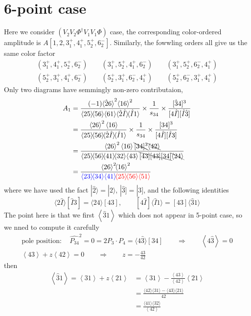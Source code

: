 \documentclass[12pt]{article}
\newcommand{\mdavg}[2]{\langle #1 \rangle\!\langle #2 \rangle}
\newcommand{\avg}[1]{\left\langle #1 \right\rangle}
\newcommand{\inavg}[2]{\langle #1 \rangle\! [#2]}
\newcommand{\rinavg}[2]{[#1]\!\langle #2 \rangle}
\newcommand{\aket}[1]{|#1\rangle}
\newcommand{\asqu}[1]{{\langle#1\rangle}^2}
\newcommand{\sket}[1]{|#1]}
\begin{document}
\section{6-point case}
Here we consider $(V_2V_2\Phi^\dagger V_1V_1 \Phi)$ case, the corresponding color-ordered amplitude is $A[1,2,3_1^+,4_1^+,5_2^+,6_2^-]$.
Similarly, the fowwling orders all give us the same color factor
\begin{gather*}
    (3_1^+,4_1^+,5_2^+,6_2^-)\qquad(3_1^+,5_2^+,4_1^+,6_2^-)\qquad (3_1^+,5_2^+,6_2^-,4_1^+)\\
    (5_2^+,3_1^+,4_1^+,6_2^-)\qquad(5_2^+,3_1^+,6_2^-,4_1^+)\qquad (5_2^+,6_2^-,3_1^+,4_1^+)
\end{gather*}
Only two diagrams have semmingly non-zero contributaion,
\begin{align*}
    A_1&=\frac{(-1)\asqu{\hat{2}6}\asqu{16}}{\mdavg{25}{56}\!\avg{61}\!\mdavg{\hat{2}\hat{I}}{\hat{I}1}}\times\frac{1}{s_{34}}\times\frac{[\hat{3}4]^3}{[4\hat{I}][\hat{I}\hat{3}]}\\
    &=\frac{\asqu{26}\avg{16}}{\mdavg{25}{56}\!\mdavg{\hat{2}\hat{I}}{\hat{I}1}}\times\frac{1}{s_{34}}\times\frac{[34]^3}{[4\hat{I}][\hat{I}3]}\\
    &=\frac{\asqu{26}\avg{16}\bcancel{[34]^3}\bcancel{\avg{42}}}{\mdavg{25}{56}\!\mdavg{41}{32}\!\avg{43}\bcancel{[43][43][34]}\bcancel{\avg{24}}}\\
    &=\frac{\asqu{26}\!\asqu{16}}{\textcolor{blue}{\mdavg{23}{34}\!\avg{41}}\!\textcolor{red}{\mdavg{25}{56}\!\avg{51}}}
\end{align*}
where we have used the fact $\aket{\hat{2}}=\aket{2}$, $\sket{\hat{3}}=\sket{3}$, and the following identities
\begin{equation*}
    \inavg{2\hat{I}}{\hat{I}3}=\inavg{24}{43}, \qquad \rinavg{4\hat{I}}{\hat{I}1}=\rinavg{43}{\hat{3}1}
\end{equation*}
The point here is that we first $\avg{\hat{3}1}$ which does not appear in 5-point case, so we nned to compute it carefully
\begin{gather*}
    \text{pole position}: \quad \hat{P_{34}}^2=0=2P_3\cdot P_4=\inavg{4\hat{3}}{34}\qquad\Rightarrow \qquad \avg{4\hat{3}}=0\\
    \avg{43}+z\avg{42}=0\qquad \Rightarrow \qquad z=-\frac{43}{42}
\end{gather*}
then
\begin{align*}
    \avg{\hat{3}1}=\avg{31}+z\avg{21}&=\avg{31}-\frac{\avg{43}}{\avg{42}}\avg{21}\\
    &=\frac{\mdavg{42}{31}-\mdavg{43}{21}}{42}\\
    &=\frac{\mdavg{41}{32}}{\avg{42}}
\end{align*}
\end{document}
